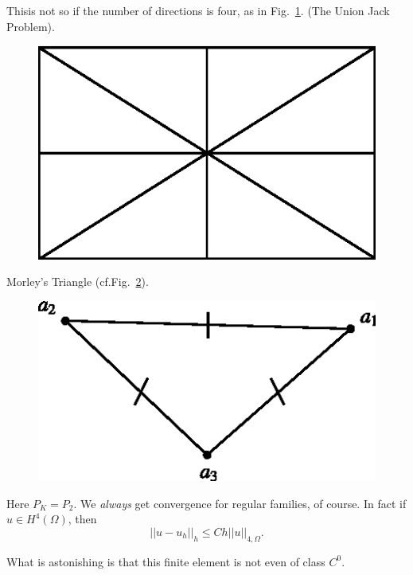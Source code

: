 \begin{example}
This\pageoriginale is not so if the number of directions is four, as
in Fig.~\ref{chap11-fig11.6}. (The Union Jack Problem).
\begin{figure}[H]
\centering
\includegraphics{figure/fig11.6.eps}
\caption{}\label{chap11-fig11.6}
\end{figure}
\end{example}

\begin{example}\label{chap11-exam11.3}
Morley's Triangle (cf.\@ Fig.~\ref{chap11-fig11.7}).
\begin{figure}[H]
\centering
\includegraphics{figure/fig11.7.eps}
\caption{}\label{chap11-fig11.7}
\end{figure}

Here $P_{K}=P_{2}$. We {\em always} get convergence for regular
families, of course. In fact if $u\in H^{4}(\Omega)$, then
\begin{equation*}
||u-u_{h}||_{h}\leq Ch||u||_{4,\Omega}.\tag{11.34}\label{chap11-eq11.34}
\end{equation*}

What is astonishing is that this finite element is not even of class $C^{0}$.
\end{example}

